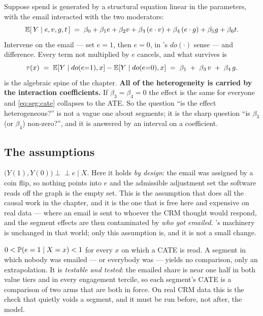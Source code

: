 Suppose spend is generated by a structural equation linear in the parameters, with the email
interacted with the two moderators:
%
\begin{equation}
  \operatorname{\mathbb{E}}[\,Y \mid e, v, g, t\,] \;=\; \beta_0 + \beta_1 e + \beta_2 v + \beta_3\,(e \cdot v)
                                  + \beta_4\,(e \cdot g) + \beta_5 g + \beta_6 t .
  \label{eq:seg:structural}
\end{equation}
%
Intervene on the email --- set $e=1$, then $e=0$, in \citeauthor{pearl2009}'s $do(\cdot)$ sense
\citep{pearl2009} --- and difference. Every term not multiplied by $e$ cancels, and what survives is
%
\begin{equation}
  \tau(x) \;=\; \operatorname{\mathbb{E}}[Y \mid do(e{=}1), x] - \operatorname{\mathbb{E}}[Y \mid do(e{=}0), x]
          \;=\; \beta_1 \;+\; \beta_3\, v \;+\; \beta_4\, g .
  \label{eq:seg:tauhat}
\end{equation}
%
 is the algebraic spine of the chapter. \textbf{All of the heterogeneity is
carried by the interaction coefficients.} If $\beta_3 = \beta_4 = 0$ the effect is the same for
everyone and \cref{eq:seg:cate} collapses to the ATE. So the question ``is the effect
heterogeneous?'' is not a vague one about segments; it is the sharp question ``is $\beta_3$
(or $\beta_4$) non-zero?'', and it is answered by an interval on a coefficient.

\subsection*{The assumptions}

\begin{assumption}[Unconfoundedness]\label{as:seg:unconf}
$\big(Y(1), Y(0)\big) \perp\!\!\!\perp e \mid X$. Here it holds \emph{by design}: the email was
assigned by a coin flip, so nothing points into $e$ and the admissible adjustment set the software
reads off the graph is the empty set. This is the assumption that does all the causal work in the
chapter, and it is the one that is free here and expensive on real data --- where an email is sent
to whoever the CRM thought would respond, and the segment effects are then contaminated by
\emph{who got emailed}. 's machinery is unchanged in that world; only this assumption
is, and it is not a small change.
\end{assumption}

\begin{assumption}\label{as:seg:pos}
$0 < \operatorname{\mathbb{P}}(e = 1 \mid X = x) < 1$ for every $x$ on which a CATE is read. A segment in which nobody
was emailed --- or everybody was --- yields no comparison, only an extrapolation. It is
\emph{testable and tested}: the emailed share is near one half in both value tiers and in every
engagement tercile, so each segment's CATE is a comparison of two arms that are both in force. On
real CRM data this is the check that quietly voids a segment, and it must be run before, not after,
the model.
\end{assumption}

